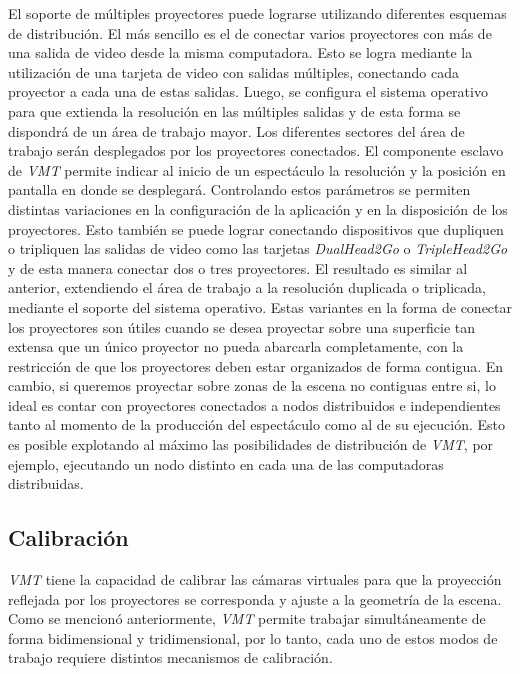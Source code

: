 El soporte de múltiples proyectores puede lograrse utilizando diferentes esquemas de distribución.
El más sencillo es el de conectar varios proyectores con más de una salida de video desde la misma computadora. Esto se logra mediante la utilización de una tarjeta de video con salidas múltiples, conectando cada proyector a cada una de estas salidas. Luego, se configura el sistema operativo para que extienda la resolución en las múltiples salidas y de esta forma se dispondrá de un área de trabajo mayor. Los diferentes sectores del área de trabajo serán desplegados por los proyectores conectados.
El componente esclavo de \emph{VMT} permite indicar al inicio de un espectáculo la resolución y la posición en pantalla en donde se desplegará. Controlando estos parámetros se permiten distintas variaciones en la configuración de la aplicación y en la disposición de los proyectores.
Esto también se puede lograr conectando dispositivos que dupliquen o tripliquen las salidas de video como las tarjetas \emph{DualHead2Go} o \emph{TripleHead2Go}\cite{Matrox} y de esta manera conectar dos o tres proyectores. El resultado es similar al anterior, extendiendo el área de trabajo a la resolución duplicada o triplicada, mediante el soporte del sistema operativo.
Estas variantes en la forma de conectar los proyectores son útiles cuando se desea proyectar sobre una superficie tan extensa que un único proyector no pueda abarcarla completamente, con la restricción de que los proyectores deben estar organizados de forma contigua.
En cambio, si queremos proyectar sobre zonas de la escena no contiguas entre si, lo ideal es contar con proyectores conectados a nodos distribuidos e independientes tanto al momento de la producción del espectáculo como al de su ejecución. Esto es posible explotando al máximo las posibilidades de distribución de \emph{VMT}, por ejemplo, ejecutando un nodo distinto en cada una de las computadoras distribuidas.

\subsection{Calibración}

\emph{VMT} tiene la capacidad de calibrar las cámaras virtuales para que la proyección reflejada por los proyectores se corresponda y ajuste a la geometría de la escena.
Como se mencionó anteriormente, \emph{VMT} permite trabajar simultáneamente de forma bidimensional y tridimensional, por lo tanto, cada uno de estos modos de trabajo requiere distintos mecanismos de calibración.

